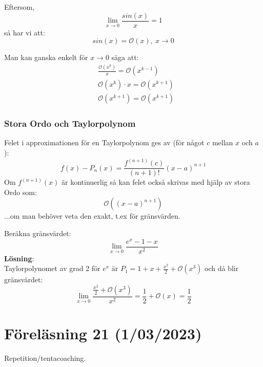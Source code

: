 \documentclass{report}
\begin{document}
\ex{}
{
Eftersom,
\begin{equation*}
\lim_{x \to 0} \frac{sin(x)}{x} = 1
\end{equation*}
så har vi att:
\begin{equation*}
	sin(x) = \mathcal{O}(x),\:x \to 0
\end{equation*}
}


Man kan ganska enkelt för $ x \to 0 $ säga att:
\begin{align*}
& \frac{\mathcal{O}(x^k)}{x} = \mathcal{O}(x^{k-1})\\
& \mathcal{O}(x^k) \cdot x = \mathcal{O}(x^{k+1})\\
& \mathcal{O}(x^{k+1}) = \mathcal{O}(x^{k+1})
\end{align*}

\subsubsection{Stora Ordo och Taylorpolynom}
Felet i approximationen för en Taylorpolynom ges av (för något $ c $ mellan $ x $ och $ a $ ):
\begin{equation*}
	f(x) - P_n(x) = \frac{f^{(n+1)}(c)}{(n+1)!}(x-a)^{n+1} 
\end{equation*}
Om $ f^{(n+1)}(x) $ är kontinuerlig så kan felet också skrivas med hjälp av stora Ordo som:
\begin{equation*}
	\mathcal{O}((x-a)^{n+1})
\end{equation*}
...om man behöver veta den exakt, t.ex för gränsvärden.

\ex{}
{
Beräkna gränsvärdet:
\begin{equation*}
\lim_{x \to 0} \frac{e^x-1-x}{x^2} 
\end{equation*}
\textbf{Lösning}:\\
Taylorpolynomet av grad 2 för $ e^x $ är $ P_1 = 1 + x + \frac{x^2}{2} + \mathcal{O}(x^3) $ och då blir gränsvärdet:
\begin{equation*}
	\lim_{x \to 0} \frac{\frac{x^2}{2} + \mathcal{O}(x^3)}{x^2} = \frac{1}{2} + \mathcal{O}(x) = \frac{1}{2}  
\end{equation*}

}

\section{Föreläsning 21 (1/03/2023)}
Repetition/tentacoaching.\\\\
\end{document}
